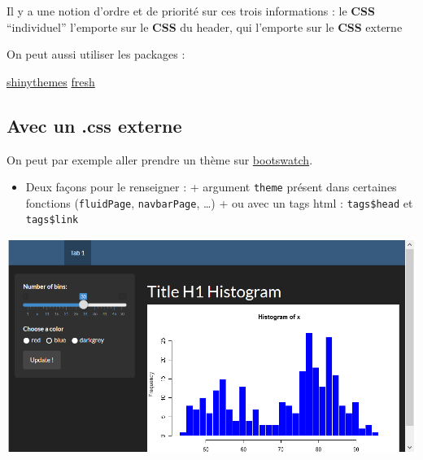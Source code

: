 \documentclass[
]{article}
\newenvironment{Shaded}{\begin{snugshade}}{\end{snugshade}}
\newcommand{\AttributeTok}[1]{\textcolor[rgb]{0.13,0.29,0.53}{#1}}
\newcommand{\CommentTok}[1]{\textcolor[rgb]{0.56,0.35,0.01}{\textit{#1}}}
\newcommand{\FunctionTok}[1]{\textcolor[rgb]{0.13,0.29,0.53}{\textbf{#1}}}
\newcommand{\NormalTok}[1]{#1}
\newcommand{\OtherTok}[1]{\textcolor[rgb]{0.56,0.35,0.01}{#1}}
\newcommand{\SpecialCharTok}[1]{\textcolor[rgb]{0.81,0.36,0.00}{\textbf{#1}}}
\newcommand{\StringTok}[1]{\textcolor[rgb]{0.31,0.60,0.02}{#1}}
\providecommand{\tightlist}{%
  \setlength{\itemsep}{0pt}\setlength{\parskip}{0pt}}
\begin{document}
Il y a une notion d'ordre et de priorité sur ces trois informations : le
\textbf{CSS} ``individuel'' l'emporte sur le \textbf{CSS} du header, qui
l'emporte sur le \textbf{CSS} externe

On peut aussi utiliser les packages :

\href{http://rstudio.github.io/shinythemes}{shinythemes}
\href{https://dreamrs.github.io/fresh/}{fresh}

\hypertarget{avec-un-.css-externe}{%
\subsection{Avec un .css externe}\label{avec-un-.css-externe}}

On peut par exemple aller prendre un thème sur
\href{http://bootswatch.com/}{bootswatch}.

\begin{itemize}
\tightlist
\item
  Deux façons pour le renseigner : + argument \texttt{theme} présent
  dans certaines fonctions (\texttt{fluidPage}, \texttt{navbarPage},
  \ldots) + ou avec un tags html : \texttt{tags\$head} et
  \texttt{tags\$link}
\end{itemize}

\begin{Shaded}
\end{Shaded}

\includegraphics{img/css1.png}
\end{document}
